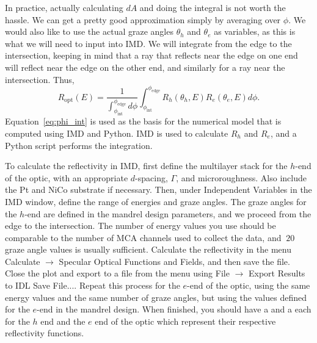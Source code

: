In practice, actually calculating $dA$ and doing the integral is not worth the
hassle. We can get a pretty good approximation simply by averaging over
$\phi$. We would also like to use the actual graze angles $\theta_h$ and
$\theta_e$ as variables, as this is what we will need to input into IMD.  We
will integrate from the edge to the intersection, keeping in mind that a ray
that reflects near the edge on one end will reflect near the edge on the other
end, and similarly for a ray near the intersection. Thus,
\begin{equation}
  \label{eq:phi_int}
  R_\text{opt}(E) =\frac{1} {
    \int^{\phi_\text{edge}}_{\phi_\text{int}}  d\phi } \int^{ \phi_\text{edge}
  }_{ \phi_\text{int}}
  R_h(\theta_h, E) R_e( \theta_e, E) d\phi .
\end{equation}
Equation~\ref{eq:phi_int} is used as the basis for the numerical model that is
computed using IMD and Python. IMD is used to calculate $R_h$ and $R_e$, and a
Python script performs the integration.

To calculate the reflectivity in IMD, first define the multilayer stack for the
$h$-end of the optic, with an appropriate $d$-spacing, $\Gamma$, and
microroughness. Also include the Pt and NiCo substrate if necessary. Then, under
Independent Variables in the IMD window, define the range of energies and graze
angles. The graze angles for the $h$-end are defined in the mandrel design
parameters, and we proceed from the edge to the intersection. The number of
energy values you use should be comparable to the number of MCA channels used to
collect the data, and $~20$ graze angle values is usually sufficient. Calculate
the reflectivity in the menu Calculate $\rightarrow$ Specular Optical Functions
and Fields, and then save the  file. Close the plot and export to a
 file from the menu using File $\rightarrow$ Export Results to IDL
Save File.... Repeat this process for the $e$-end of the optic, using the same
energy values and the same number of graze angles, but using the values defined
for the $e$-end in the mandrel design. When finished, you should have a
 and a  each for the $h$ end and the $e$ end of the optic
which represent their respective reflectivity functions.


